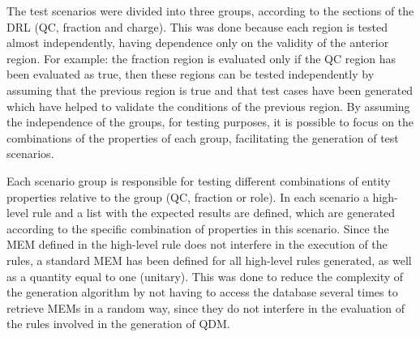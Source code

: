 \documentclass[twocolumn]{bmcart}%
\begin{document}

The test scenarios were divided into three groups, according to the sections of the DRL (QC, fraction and charge). This was done because each region is tested almost independently, having dependence only on the validity of the anterior region. For example: the fraction region is evaluated only if the QC region has been evaluated as true, then these regions can be tested independently by assuming that the previous region is true and that test cases have been generated which have helped to validate the conditions of the previous region. By assuming the independence of the groups, for testing purposes, it is possible to focus on the combinations of the properties of each group, facilitating the generation of test scenarios.


Each scenario group is responsible for testing different combinations of entity properties relative to the group (QC, fraction or role). In each scenario a high-level rule and a list with the expected results are defined, which are generated according to the specific combination of properties in this scenario. Since the MEM defined in the high-level rule does not interfere in the execution of the rules, a standard MEM has been defined for all high-level rules generated, as well as a quantity equal to one (unitary). This was done to reduce the complexity of the generation algorithm by not having to access the database several times to retrieve MEMs in a random way, since they do not interfere in the evaluation of the rules involved in the generation of QDM.
\end{document}
